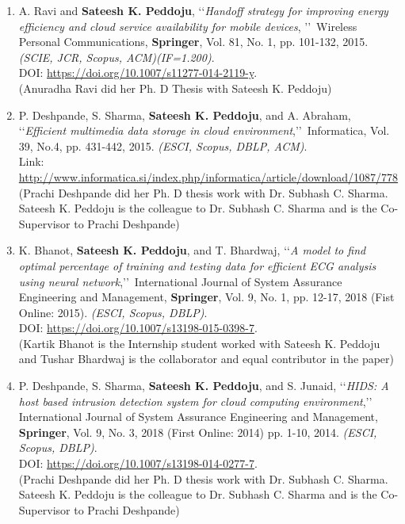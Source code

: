 \begin{enumerate}
	\item
	A. Ravi and \textbf{Sateesh K. Peddoju}, \lq\lq \textit{Handoff strategy for improving energy efficiency and cloud service availability for mobile devices}, \rq\rq\, Wireless Personal Communications, \textbf{Springer}, Vol. 81, No. 1, pp. 101-132, 2015. \emph{(SCIE, JCR, Scopus, ACM)(IF=1.200)}. \\DOI: \url{https://doi.org/10.1007/s11277-014-2119-y}. \\(Anuradha Ravi did her Ph. D Thesis with Sateesh K. Peddoju)
	
	
	\item
	P. Deshpande, S. Sharma, \textbf{Sateesh K. Peddoju}, and A. Abraham, \lq\lq \textit{Efficient multimedia data storage in cloud environment},\rq\rq\, Informatica, Vol. 39, No.4, pp. 431-442, 2015. \emph{(ESCI, Scopus, DBLP, ACM)}. \\Link: \url{http://www.informatica.si/index.php/informatica/article/download/1087/778} \\(Prachi Deshpande did her Ph. D thesis work with Dr. Subhash C. Sharma. Sateesh K. Peddoju is the colleague to Dr. Subhash C. Sharma and is the Co-Supervisor to Prachi Deshpande)
	
	\item
	K. Bhanot, \textbf{Sateesh K. Peddoju}, and T. Bhardwaj, \lq\lq \textit{A model to find optimal percentage of training and testing data for efficient ECG analysis using neural network},\rq\rq\, International Journal of System Assurance Engineering and Management, \textbf{Springer}, Vol. 9, No. 1, pp. 12-17, 2018 (Fist Online: 2015). \emph{(ESCI, Scopus, DBLP)}. \\DOI: \url{https://doi.org/10.1007/s13198-015-0398-7}.
\\ (Kartik Bhanot is the Internship student worked with Sateesh K. Peddoju and Tushar Bhardwaj is the collaborator and equal contributor in the paper)
	
	\item
	P. Deshpande, S. Sharma, \textbf{Sateesh K. Peddoju}, and S. Junaid, \lq\lq \textit{HIDS: A host based intrusion detection system for cloud computing environment},\rq\rq\, International Journal of System Assurance Engineering and Management, \textbf{Springer}, Vol. 9, No. 3, 2018 (First Online: 2014) pp. 1-10, 2014. \emph{(ESCI, Scopus, DBLP)}. \\DOI: \url{https://doi.org/10.1007/s13198-014-0277-7}.  \\(Prachi Deshpande did her Ph. D thesis work with Dr. Subhash C. Sharma. Sateesh K. Peddoju is the colleague to Dr. Subhash C. Sharma and is the Co-Supervisor to Prachi Deshpande)
	
	
\end{enumerate}		